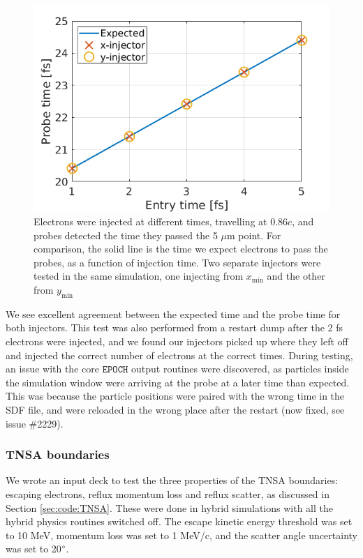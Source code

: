 \documentclass[12pt]{article}
\numberwithin{equation}{section}
\begin{document}
\begin{figure}
\centering
  \includegraphics[width=0.6\linewidth]{Figures/bench_file_injector.png}
\caption{Electrons were injected at different times, travelling at 0.86$c$, and probes detected the time they passed the 5 $\mu$m point. For comparison, the solid line is the time we expect electrons to pass the probes, as a function of injection time. Two separate injectors were tested in the same simulation, one injecting from $x_\text{min}$ and the other from $y_\text{min}$}
\label{fig:bench:file_injectors}
\end{figure}

We see excellent agreement between the expected time and the probe time for both injectors. This test was also performed from a restart dump after the 2 fs electrons were injected, and we found our injectors picked up where they left off and injected the correct number of electrons at the correct times. During testing, an issue with the core $\texttt{EPOCH}$ output routines were discovered, as particles inside the simulation window were arriving at the probe at a later time than expected. This was because the particle positions were paired with the wrong time in the SDF file, and were reloaded in the wrong place after the restart (now fixed, see issue \#2229).

\subsubsection{TNSA boundaries} \label{sec:bench:TNSA}

We wrote an input deck to test the three properties of the TNSA boundaries: escaping electrons, reflux momentum loss and reflux scatter, as discussed in Section \ref{sec:code:TNSA}. These were done in hybrid simulations with all the hybrid physics routines switched off. The escape kinetic energy threshold was set to 10 MeV, momentum loss was set to 1 MeV/c, and the scatter angle uncertainty was set to 20$\degree$.
\end{document}
